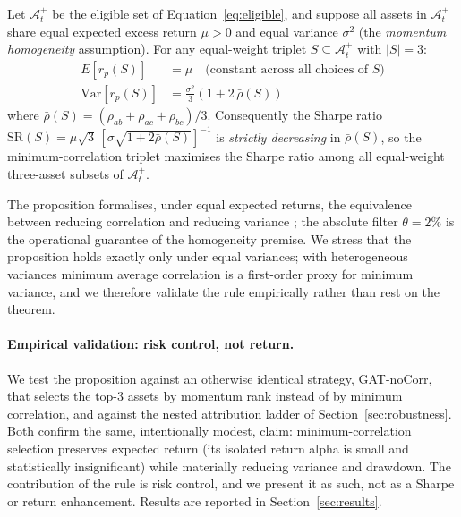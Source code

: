 \begin{proposition}
\label{prop:mincorr}
Let $\mathcal{A}_t^+$ be the eligible set of Equation~\eqref{eq:eligible}, and
suppose all assets in $\mathcal{A}_t^+$ share equal expected excess return
$\mu > 0$ and equal variance $\sigma^2$ (the \emph{momentum homogeneity}
assumption). For any equal-weight triplet $S \subseteq \mathcal{A}_t^+$ with
$|S| = 3$:
\begin{align}
E[r_p(S)] &= \mu \quad \text{(constant across all choices of }S\text{)} \label{eq:prop_eret} \\
\mathrm{Var}[r_p(S)] &= \frac{\sigma^2}{3}\!\left(1 + 2\,\bar{\rho}(S)\right) \label{eq:prop_var}
\end{align}
where $\bar{\rho}(S) = (\rho_{ab}+\rho_{ac}+\rho_{bc})/3$. Consequently the Sharpe
ratio $\mathrm{SR}(S) = \mu\sqrt{3}\,[\sigma\sqrt{1+2\bar{\rho}(S)}]^{-1}$ is
\emph{strictly decreasing} in $\bar{\rho}(S)$, so the minimum-correlation triplet
maximises the Sharpe ratio among all equal-weight three-asset subsets of
$\mathcal{A}_t^+$.
\end{proposition}

The proposition formalises, under equal expected returns, the equivalence between
reducing correlation and reducing variance \citep{markowitz1952, demiguel2009};
the absolute filter $\theta = 2\%$ is the operational guarantee of the homogeneity
premise. We stress that the proposition holds exactly only under equal variances;
with heterogeneous variances minimum average correlation is a first-order proxy
for minimum variance, and we therefore validate the rule empirically rather
than rest on the theorem.

\paragraph{Empirical validation: risk control, not return.}
We test the proposition against an otherwise identical strategy, GAT-noCorr, that
selects the top-3 assets by momentum rank instead of by minimum correlation, and
against the nested attribution ladder of Section~\ref{sec:robustness}.
Both confirm the same, intentionally modest, claim: minimum-correlation selection
preserves expected return (its isolated return alpha is small and statistically
insignificant) while materially reducing variance and drawdown. The contribution
of the rule is risk control, and we present it as such, not as a Sharpe or
return enhancement. Results are reported in Section~\ref{sec:results}.

